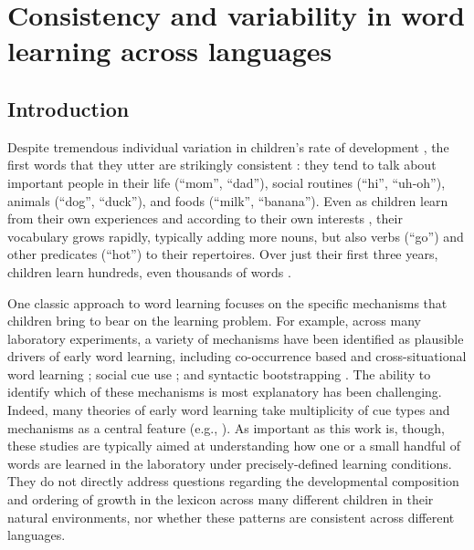 \documentclass[
   11pt,
       ]{book}
\begin{document}
\hypertarget{aoa-pred}{%
\chapter{Consistency and variability in word learning across languages}\label{aoa-pred}}

\hypertarget{introduction}{%
\section{Introduction}\label{introduction}}

Despite tremendous individual variation in children's rate of development \citep{fenson2007}, the first words that they utter are strikingly consistent \citep{tardif2008,schneider2015}: they tend to talk about important people in their life (``mom'', ``dad''), social routines (``hi'', ``uh-oh''), animals (``dog'', ``duck''), and foods (``milk'', ``banana''). Even as children learn from their own experiences and according to their own interests \citep{mayor2014,nelson1973}, their vocabulary grows rapidly, typically adding more nouns, but also verbs (``go'') and other predicates (``hot'') to their repertoires. Over just their first three years, children learn hundreds, even thousands of words \citep{fenson1994,mayor2011}.

One classic approach to word learning focuses on the specific mechanisms that children bring to bear on the learning problem. For example, across many laboratory experiments, a variety of mechanisms have been identified as plausible drivers of early word learning, including co-occurrence based and cross-situational word learning \citep{schwartz1983,yu2007}; social cue use \citep{baldwin1993}; and syntactic bootstrapping \citep{gleitman1990,mintz2003}. The ability to identify which of these mechanisms is most explanatory has been challenging. Indeed, many theories of early word learning take multiplicity of cue types and mechanisms as a central feature (e.g., \citealp{hollich2000,bloom2000}). As important as this work is, though, these studies are typically aimed at understanding how one or a small handful of words are learned in the laboratory under precisely-defined learning conditions. They do not directly address questions regarding the developmental composition and ordering of growth in the lexicon across many different children in their natural environments, nor whether these patterns are consistent across different languages.
\end{document}
